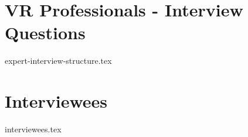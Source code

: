 
\appendix
\chapter{VR Professionals - Interview Questions}
\label{appendix:ex-interview-structure}
{expert-interview-structure.tex}

\chapter{Interviewees}
\label{appendix:interviewees}
{interviewees.tex}
